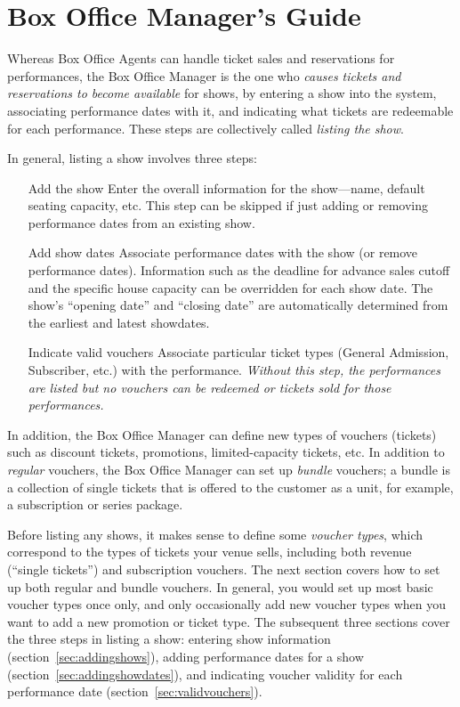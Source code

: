 
\section{Box Office Manager's Guide}
\label{chap:bom}

Whereas Box Office Agents can handle ticket sales and reservations for
performances, the Box Office Manager is the one who \emph{causes tickets
  and reservations to become available} for shows, by entering
a show into the system, associating performance dates with
it, and indicating what tickets are redeemable for each
performance. These steps are
collectively called \emph{listing the show}.

In general, listing a show involves three steps:

\begin{enumerate}
\item[Add the show] Enter the overall information for the show---name, 
  default seating capacity, etc.  This step can be
  skipped if just adding or removing performance dates from an existing
  show. 
\item[Add show dates] Associate performance dates with the show (or
  remove performance dates).  Information such as the deadline for
  advance sales cutoff and the specific house capacity can be overridden
  for each show date.  The show's ``opening date'' and ``closing date''
  are automatically determined from the earliest and latest showdates.
\item[Indicate valid vouchers] Associate particular ticket types
  (General Admission, Subscriber, etc.) with the performance.
  \emph{Without this step, the performances are listed but no vouchers
    can be redeemed or tickets sold for those performances.}
\end{enumerate}

In addition, the Box Office Manager can define new types of vouchers
(tickets) such as discount tickets, promotions, limited-capacity
tickets, etc.  In addition to \emph{regular} vouchers, the Box Office
Manager can set up \emph{bundle} vouchers; a bundle is a collection of
single tickets that is offered to the customer as a unit, for example, a
subscription or series package.

Before listing any shows, it makes sense to define some \emph{voucher
  types}, which correspond to the types of tickets your venue sells,
including both revenue (``single tickets'') and subscription vouchers.
The next section covers how to set up both regular and bundle vouchers.
In general, you would set up most basic voucher types once only, and
only occasionally add new voucher types when you want to add a new
promotion or ticket type.
The subsequent three sections cover the three steps in listing a show:
entering show information (section~\ref{sec:addingshows}), adding
performance dates for a show (section~\ref{sec:addingshowdates}), and
indicating voucher validity for each performance date
(section~\ref{sec:validvouchers}).  

